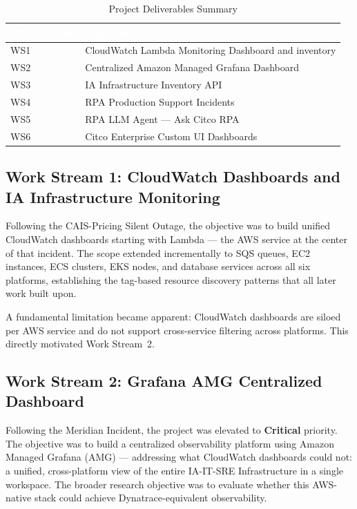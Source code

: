\begin{table}[htbp]
\centering
\caption{Project Deliverables Summary}
\label{tab:deliverables_summary}
\begin{tabular}{>{\centering\arraybackslash}p{} p{}}
\hline
\rowcolor{smubrand}\textcolor{white}{\textbf{Work Stream}} & \textcolor{white}{\textbf{Deliverable Scope}} \\
\hline
\rowcolor{tablerowA} WS1 & CloudWatch Lambda Monitoring Dashboard and inventory \\
\rowcolor{tablerowB} WS2 & Centralized Amazon Managed Grafana Dashboard \\
\rowcolor{tablerowA} WS3 & IA Infrastructure Inventory API \\
\rowcolor{tablerowB} WS4 & RPA Production Support Incidents \\
\rowcolor{tablerowA} WS5 & RPA LLM Agent --- Ask Citco RPA \\
\rowcolor{tablerowB} WS6 & Citco Enterprise Custom UI Dashboards \\
\hline
\end{tabular}
\end{table}

\subsection{Work Stream 1: CloudWatch Dashboards and IA Infrastructure Monitoring}

Following the CAIS-Pricing Silent Outage, the objective was to build unified
CloudWatch dashboards starting with Lambda --- the AWS service at the center
of that incident. The scope extended incrementally to SQS queues, EC2 instances,
ECS clusters, EKS nodes, and database services across all six platforms,
establishing the tag-based resource discovery patterns that all later work
built upon.

A fundamental limitation became apparent: CloudWatch dashboards are siloed
per AWS service and do not support cross-service filtering across platforms.
This directly motivated Work Stream~2.


\subsection{Work Stream 2: Grafana AMG Centralized Dashboard}

Following the Meridian Incident, the project was elevated to
\textbf{Critical} priority. The objective was to build a centralized
observability platform using Amazon Managed Grafana (AMG) --- addressing
what CloudWatch dashboards could not: a unified, cross-platform view of the
entire IA-IT-SRE Infrastructure in a single workspace. The broader research
objective was to evaluate whether this AWS-native stack could achieve
Dynatrace-equivalent observability.

